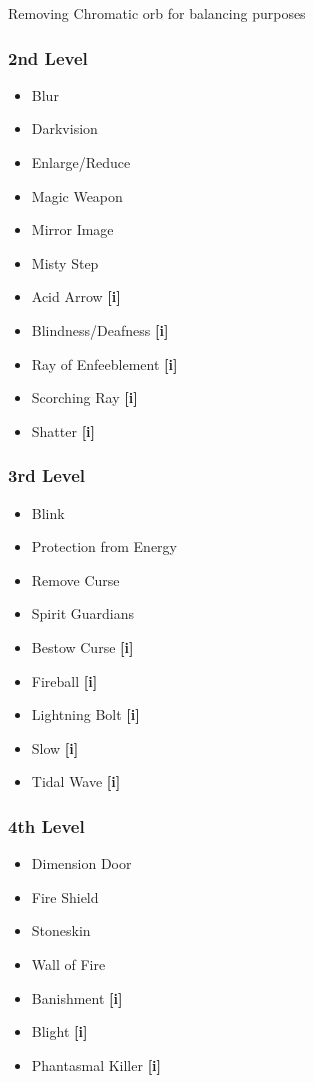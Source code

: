 \begin{multicols*}{3}
\begin{small}
\smallskip

{\color{red} Removing Chromatic orb for balancing purposes }

\subsubsection{2nd Level}

\begin{itemize}
\item Blur
\item Darkvision
\item Enlarge/Reduce
\item Magic Weapon
\item Mirror Image
\item Misty Step
\item Acid Arrow \textbf{[i]}
\item Blindness/Deafness \textbf{[i]}
\item Ray of Enfeeblement \textbf{[i]}
\item Scorching Ray \textbf{[i]}
\item Shatter \textbf{[i]}
\end{itemize}

\subsubsection{3rd Level}

\begin{itemize}
\item Blink
\item Protection from Energy
\item Remove Curse
\item Spirit Guardians
\item Bestow Curse \textbf{[i]}
\item Fireball \textbf{[i]}
\item Lightning Bolt \textbf{[i]}
\item Slow \textbf{[i]}
\item Tidal Wave \textbf{[i]}
\end{itemize}

\subsubsection{4th Level}

\begin{itemize}
\item Dimension Door
\item Fire Shield
\item Stoneskin
\item Wall of Fire 
\item Banishment  \textbf{[i]}
\item Blight \textbf{[i]}
\item Phantasmal Killer \textbf{[i]}
\end{itemize}



\end{small}
\end{multicols*}
